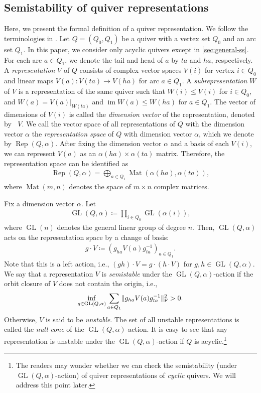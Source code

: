 \documentclass[a4paper,11pt]{article}
\numberwithin{equation}{section}
\DeclareMathOperator{\GL}{GL}
\DeclareMathOperator{\Mat}{Mat}
\DeclareMathOperator{\Rep}{Rep}
\DeclareMathOperator{\im}{im}
\DeclareMathOperator{\dimv}{\underline{dim}}
\DeclarePairedDelimiter{\norm}{\lVert}{\rVert}
\begin{document}
\subsection{Semistability of quiver representations}\label{sec:semistability}
Here, we present the formal definition of a quiver representation.
We follow the terminologies in \citep{Derksen2017book,Burgisser2019}.
Let $Q = (Q_0, Q_1)$ be a quiver with a vertex set $Q_0$ and an arc set $Q_1$.
In this paper, we consider only acyclic quivers except in \cref{sec:general-ss}.
For each arc $a \in Q_1$, we denote the tail and head of $a$ by $ta$ and $ha$, respectively.
A \emph{representation} $V$ of $Q$ consists of complex vector spaces $V(i)$ for vertex $i \in Q_0$ and linear maps $V(a): V(ta) \to V(ha)$ for arc $a \in Q_1$.
A \emph{subrepresentation} $W$ of $V$ is a representation of the same quiver such that $W(i) \leq V(i)$ for $i \in Q_0$, and $W(a) = V(a)|_{W(ta)}$ and $\im W(a) \leq W(ha)$ for $a \in Q_1$.
The vector of dimensions of $V(i)$ is called the \emph{dimension vector} of the representation, denoted by $\dimv V$.
We call the vector space of all representations of $Q$ with the dimension vector $\alpha$ the \emph{representation space} of $Q$ with dimension vector $\alpha$, which we denote by $\Rep(Q, \alpha)$.
After fixing the dimension vector $\alpha$ and a basis of each $V(i)$, we can represent $V(a)$ as an $\alpha(ha) \times \alpha(ta)$ matrix.
Therefore, the representation space can be identified as
\begin{align}
    \Rep(Q, \alpha) = \bigoplus_{a \in Q_1} \Mat(\alpha(ha), \alpha(ta)),
\end{align}
where $\Mat(m,n)$ denotes the space of $m \times n$ complex matrices.

Fix a dimension vector $\alpha$.
Let
\begin{align}
    \GL(Q, \alpha) \coloneqq \prod_{i \in Q_0} \GL(\alpha(i)),
\end{align}
where $\GL(n)$ denotes the general linear group of degree $n$.
Then, $\GL(Q, \alpha)$ acts on the representation space by a change of basis:
\begin{align}
    g \cdot V \coloneqq (g_{ha} V(a) g_{ta}^{-1})_{a \in Q_1}.
\end{align} 
Note that this is a left action, i.e., $(gh) \cdot V = g \cdot (h \cdot V)$ for $g, h \in \GL(Q, \alpha)$.
We say that a representation $V$ is \emph{semistable} under the $\GL(Q,\alpha)$-action if the orbit closure of $V$ does not contain the origin, i.e.,
\begin{align}
    \inf_{g \in \GL(Q, \alpha)} \sum_{a \in Q_1} \norm{g_{ha} V(a) g_{ta}^{-1}}_{\mathrm{F}}^2 > 0.
\end{align}
Otherwise, $V$ is said to be \emph{unstable}.
The set of all unstable representations is called the \emph{null-cone} of the $\GL(Q, \alpha)$-action.
It is easy to see that any representation is unstable under the $\GL(Q, \alpha)$-action if $Q$ is acyclic.\footnote{The readers may wonder whether we can check the semistability (under $\GL(Q, \alpha)$-action) of quiver representations of \emph{cyclic} quivers. We will address this point later.}
\end{document}
